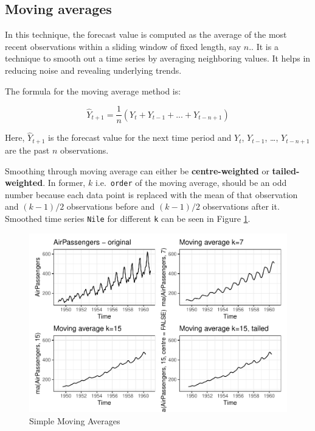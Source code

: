 \documentclass[
]{book}
\begin{document}
\hypertarget{moving-averages}{%
\subsection{Moving averages}\label{moving-averages}}

In this technique, the forecast value is computed as the average of the most recent observations within a sliding window of fixed length, say \(n\).. It is a technique to smooth out a time series by averaging neighboring values. It helps in reducing noise and revealing underlying trends.

The formula for the moving average method is:

\[
\hat{Y}_{t+1} = \frac{1}{n}(Y_t + Y_{t-1} + ... + Y_{t-n+1})
\]

Here, \(\hat{Y}_{t+1}\) is the forecast value for the next time period and \(Y_t\), \(Y_{t-1}\), \ldots, \(Y_{t-n+1}\) are the past \(n\) observations.

Smoothing through moving average can either be \textbf{centre-weighted} or \textbf{tailed-weighted}. In former, \(k\) i.e.~\texttt{order} of the moving average, should be an odd number because each data point is replaced with the mean of that observation and \((k-1)/2\) observations before and \((k-1)/2\) observations after it. Smoothed time series \texttt{Nile} for different \texttt{k} can be seen in Figure \ref{fig:ma}.

\begin{figure}

{\centering \includegraphics{DauR_files/figure-latex/ma-1} 

}

\caption{Simple Moving Averages}\label{fig:ma}
\end{figure}
\end{document}
